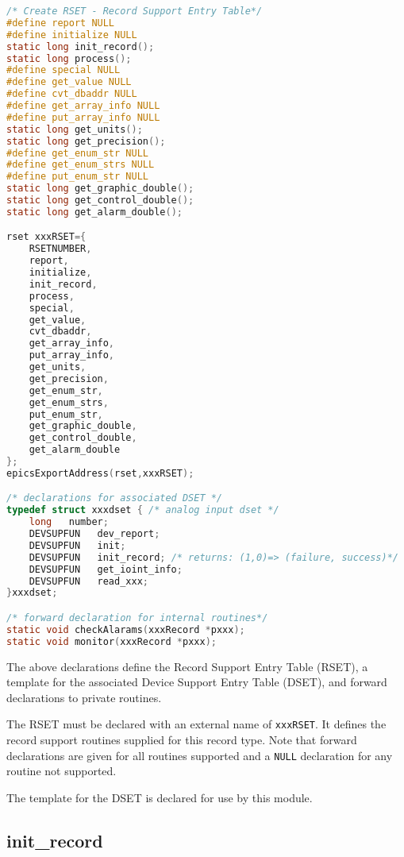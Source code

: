 \begin{lstlisting}[language=C]
/* Create RSET - Record Support Entry Table*/
#define report NULL
#define initialize NULL
static long init_record();
static long process();
#define special NULL
#define get_value NULL
#define cvt_dbaddr NULL
#define get_array_info NULL
#define put_array_info NULL
static long get_units();
static long get_precision();
#define get_enum_str NULL
#define get_enum_strs NULL
#define put_enum_str NULL
static long get_graphic_double();
static long get_control_double();
static long get_alarm_double();

rset xxxRSET={
    RSETNUMBER,
    report,
    initialize,
    init_record,
    process,
    special,
    get_value,
    cvt_dbaddr,
    get_array_info,
    put_array_info,
    get_units,
    get_precision,
    get_enum_str,
    get_enum_strs,
    put_enum_str,
    get_graphic_double,
    get_control_double,
    get_alarm_double
};
epicsExportAddress(rset,xxxRSET);

/* declarations for associated DSET */
typedef struct xxxdset { /* analog input dset */
    long   number;
    DEVSUPFUN   dev_report;
    DEVSUPFUN   init;
    DEVSUPFUN   init_record; /* returns: (1,0)=> (failure, success)*/
    DEVSUPFUN   get_ioint_info;
    DEVSUPFUN   read_xxx;
}xxxdset;

/* forward declaration for internal routines*/
static void checkAlarams(xxxRecord *pxxx);
static void monitor(xxxRecord *pxxx);
\end{lstlisting}

The above declarations define the Record Support Entry Table (RSET), a template for the associated Device Support Entry Table (DSET), and forward declarations to private routines.

The RSET must be declared with an external name of \verb|xxxRSET|. It defines the record support routines supplied for this record type.
Note that forward declarations are given for all routines supported and a \verb|NULL| declaration for any routine not supported.

The template for the DSET is declared for use by this module.

\subsection{init\_record}

